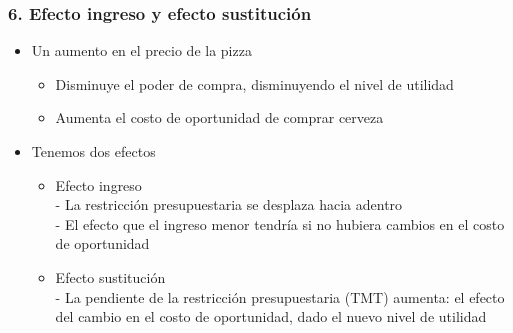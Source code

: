 \documentclass[14pt]{beamer}
\begin{document}
\begin{frame}
\frametitle{6. Efecto ingreso y efecto sustitución}
\begin{itemize}
    \item Un aumento en el precio de la pizza
    \begin{itemize}
        \item Disminuye el poder de compra, disminuyendo el nivel de utilidad
        \item Aumenta el costo de oportunidad de comprar cerveza
    \end{itemize}
    \item Tenemos dos efectos
    \begin{itemize}
    \item Efecto ingreso \\
    - La restricción presupuestaria se desplaza hacia adentro \\
    - El efecto que el ingreso menor tendría si no hubiera cambios en el costo de oportunidad
    \item Efecto sustitución \\
    - La pendiente de la restricción presupuestaria (TMT) aumenta: el efecto del cambio en el costo de oportunidad, dado el nuevo nivel de utilidad
    \end{itemize}
\end{itemize} 
\end{frame}
\end{document}
